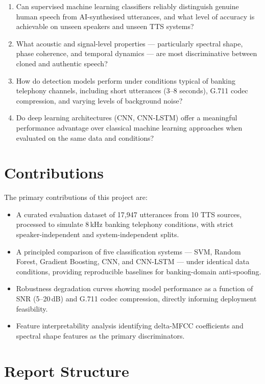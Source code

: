\documentclass[12pt, a4paper, oneside]{report}
\begin{document}
\begin{enumerate}[leftmargin=*, label=\textbf{RQ\arabic*.}]
    \item Can supervised machine learning classifiers reliably distinguish genuine human speech from AI-synthesised utterances, and what level of accuracy is achievable on unseen speakers and unseen TTS systems?
    \item What acoustic and signal-level properties --- particularly spectral shape, phase coherence, and temporal dynamics --- are most discriminative between cloned and authentic speech?
    \item How do detection models perform under conditions typical of banking telephony channels, including short utterances (3--8 seconds), G.711 codec compression, and varying levels of background noise?
    \item Do deep learning architectures (CNN, CNN-LSTM) offer a meaningful performance advantage over classical machine learning approaches when evaluated on the same data and conditions?
\end{enumerate}

\section{Contributions}

The primary contributions of this project are:

\begin{itemize}[leftmargin=*]
    \item A curated evaluation dataset of 17,947 utterances from 10 TTS sources, processed to simulate 8\,kHz banking telephony conditions, with strict speaker-independent and system-independent splits.
    \item A principled comparison of five classification systems --- SVM, Random Forest, Gradient Boosting, CNN, and CNN-LSTM --- under identical data conditions, providing reproducible baselines for banking-domain anti-spoofing.
    \item Robustness degradation curves showing model performance as a function of SNR (5--20\,dB) and G.711 codec compression, directly informing deployment feasibility.
    \item Feature interpretability analysis identifying delta-MFCC coefficients and spectral shape features as the primary discriminators.
\end{itemize}

\section{Report Structure}
\end{document}
